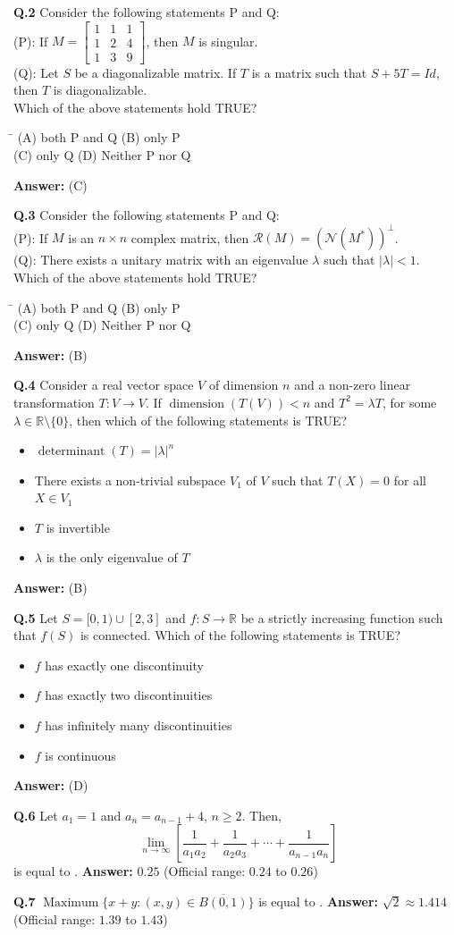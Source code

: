 \documentclass[11pt,a4paper]{article}
\newcommand{\optsfourA}[4]{%
  \begin{tabbing}
    \hspace{0.48\linewidth}\=\kill
    (A) #1 \> (B) #2 \\[2pt]
    (C) #3 \> (D) #4
  \end{tabbing}%
}
\newcommand{\optslistA}[4]{%
  \begin{itemize}
    \setlength{\itemsep}{2pt}\setlength{\parskip}{0pt}
    \item[(A)] #1
    \item[(B)] #2
    \item[(C)] #3
    \item[(D)] #4
  \end{itemize}%
}
\newcommand{\ans}[1]{\textbf{Answer:} #1\par\medskip}
\begin{document}
\textbf{Q.2} Consider the following statements P and Q:\\
(P): If $M = \begin{bmatrix} 1 & 1 & 1 \\ 1 & 2 & 4 \\ 1 & 3 & 9 \end{bmatrix}$, then $M$ is singular.\\
(Q): Let $S$ be a diagonalizable matrix. If $T$ is a matrix such that $S + 5T = Id$, then $T$ is diagonalizable.\\
Which of the above statements hold TRUE?
\optsfourA{both P and Q}{only P}{only Q}{Neither P nor Q}
\ans{(C)}

\textbf{Q.3} Consider the following statements P and Q:\\
(P): If $M$ is an $n \times n$ complex matrix, then $\mathcal{R}(M) = (\mathcal{N}(M^*))^\perp$.\\
(Q): There exists a unitary matrix with an eigenvalue $\lambda$ such that $|\lambda| < 1$.\\
Which of the above statements hold TRUE?
\optsfourA{both P and Q}{only P}{only Q}{Neither P nor Q}
\ans{(B)}

\textbf{Q.4} Consider a real vector space $V$ of dimension $n$ and a non-zero linear transformation $T : V \to V$. If $\operatorname{dimension}(T(V)) < n$ and $T^2 = \lambda T$, for some $\lambda \in \mathbb{R} \setminus \{0\}$, then which of the following statements is TRUE?
\optslistA{$\operatorname{determinant}(T) = |\lambda|^n$}{There exists a non-trivial subspace $V_1$ of $V$ such that $T(X) = 0$ for all $X \in V_1$}{$T$ is invertible}{$\lambda$ is the only eigenvalue of $T$}
\ans{(B)}

\textbf{Q.5} Let $S = [0, 1) \cup [2, 3]$ and $f : S \to \mathbb{R}$ be a strictly increasing function such that $f(S)$ is connected. Which of the following statements is TRUE?
\optslistA{$f$ has exactly one discontinuity}{$f$ has exactly two discontinuities}{$f$ has infinitely many discontinuities}{$f$ is continuous}
\ans{(D)}

\textbf{Q.6} Let $a_1 = 1$ and $a_n = a_{n-1} + 4$, $n \ge 2$. Then,
\[
  \lim_{n\to\infty} \left[\frac{1}{a_1 a_2} + \frac{1}{a_2 a_3} + \cdots + \frac{1}{a_{n-1} a_n}\right]
\]
is equal to \underline{\hspace{2cm}}.
\ans{$0.25$ (Official range: $0.24$ to $0.26$)}

\textbf{Q.7} $\operatorname{Maximum}\{x + y : (x, y) \in \overline{B(0, 1)}\}$ is equal to \underline{\hspace{2cm}}.
\ans{$\sqrt{2} \approx 1.414$ (Official range: $1.39$ to $1.43$)}
\end{document}
